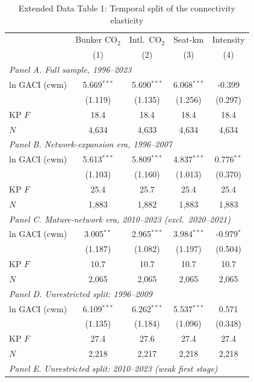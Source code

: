 \documentclass[12pt]{article}
\begin{document}
\begin{table}[htbp]
\centering
\begin{threeparttable}
\caption{Extended Data Table 1: Temporal split of the connectivity elasticity}
\label{tab:temporal}
\footnotesize
\begin{tabular}{lcccc}
\toprule
 & \multicolumn{1}{c}{Bunker CO$_2$} & \multicolumn{1}{c}{Intl.\ CO$_2$} & \multicolumn{1}{c}{Seat-km} & \multicolumn{1}{c}{Intensity} \\
 & (1) & (2) & (3) & (4) \\
\midrule
\multicolumn{5}{l}{\textit{Panel A. Full sample, 1996--2023}} \\
  ln GACI (cwm) & 5.669$^{***}$ & 5.690$^{***}$ & 6.068$^{***}$ & -0.399 \\
   & (1.119) & (1.135) & (1.256) & (0.297) \\
  KP $F$ & 18.4 & 18.4 & 18.4 & 18.4 \\
  $N$ & 4,634 & 4,633 & 4,634 & 4,634 \\
\midrule
\multicolumn{5}{l}{\textit{Panel B. Network-expansion era, 1996--2007}} \\
  ln GACI (cwm) & 5.613$^{***}$ & 5.809$^{***}$ & 4.837$^{***}$ & 0.776$^{**}$ \\
   & (1.103) & (1.160) & (1.013) & (0.370) \\
  KP $F$ & 25.4 & 25.7 & 25.4 & 25.4 \\
  $N$ & 1,883 & 1,882 & 1,883 & 1,883 \\
\midrule
\multicolumn{5}{l}{\textit{Panel C. Mature-network era, 2010--2023 (excl.\ 2020--2021)}} \\
  ln GACI (cwm) & 3.005$^{**}$ & 2.965$^{***}$ & 3.984$^{***}$ & -0.979$^{*}$ \\
   & (1.187) & (1.082) & (1.197) & (0.504) \\
  KP $F$ & 10.7 & 10.7 & 10.7 & 10.7 \\
  $N$ & 2,065 & 2,065 & 2,065 & 2,065 \\
\midrule
\multicolumn{5}{l}{\textit{Panel D. Unrestricted split: 1996--2009}} \\
  ln GACI (cwm) & 6.109$^{***}$ & 6.262$^{***}$ & 5.537$^{***}$ & 0.571 \\
   & (1.135) & (1.184) & (1.096) & (0.348) \\
  KP $F$ & 27.4 & 27.6 & 27.4 & 27.4 \\
  $N$ & 2,218 & 2,217 & 2,218 & 2,218 \\
\midrule
\multicolumn{5}{l}{\textit{Panel E. Unrestricted split: 2010--2023 (weak first stage)}} \\

\end{tabular}
\end{threeparttable}
\end{table}
\end{document}
